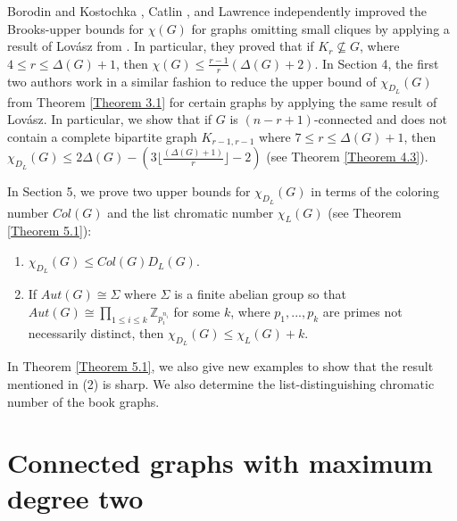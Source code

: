 \documentclass[12pt,reqno,a4paper]{amsart}
\theoremstyle{definition}
\begin{document}
\qquad \qquad Borodin and Kostochka \cite{BK1977}, Catlin \cite{Cat1978}, and Lawrence \cite{Law1978} independently improved the Brooks-upper bounds for $\chi (G)$ for graphs omitting small cliques by applying a result of Lov\'{a}sz from \cite{Lov1966}.
In particular, they proved that if $K_{r} \not\subseteq G$, where $4 \leq r \leq \Delta(G)+1$, then $\chi(G) \leq \frac{r-1}{r}(\Delta(G) + 2)$.
In Section 4, the first two authors work in a similar fashion to reduce the upper bound of $\chi_{D_{L}}(G)$ from Theorem \ref{Theorem 3.1} for certain graphs by applying the same result of Lov\'{a}sz. In particular, we show that if $G$ is $(n-r+1)$-connected and does not contain a complete bipartite graph $K_{r-1,r-1}$ where $7\leq r\leq \Delta(G)+1$, then $\chi_{D_{L}}(G)\leq 2\Delta(G)- (3\lfloor\frac{(\Delta(G)+1)}{r}\rfloor-2)$ (see Theorem \ref{Theorem 4.3}).

\qquad \qquad In Section 5, we prove two upper bounds for $\chi_{D_{L}}(G)$ in terms of the coloring number $Col(G)$ and the list chromatic number $\chi_{L}(G)$ (see Theorem \ref{Theorem 5.1}):
\begin{enumerate}
    \item $\chi_{D_{L}}(G)\leq Col(G)D_{L}(G)$.
    
    \item If $Aut(G)\cong \Sigma$ where $\Sigma$ is a finite abelian group so that $Aut(G)\cong \prod_{1\leq i\leq k} \mathbb{Z}_{p_{i}^{n_{i}}}$ for some $k$, where $p_{1},...,p_{k}$ are primes not necessarily distinct, then $\chi_{D_{L}}(G)\leq \chi_{L}(G)+k$.
\end{enumerate}

In Theorem \ref{Theorem 5.1}, we also give new examples to show that the result mentioned in (2) is sharp.
We also determine the list-distinguishing chromatic number of the book graphs.


\section{Connected graphs with maximum degree two}
\end{document}
